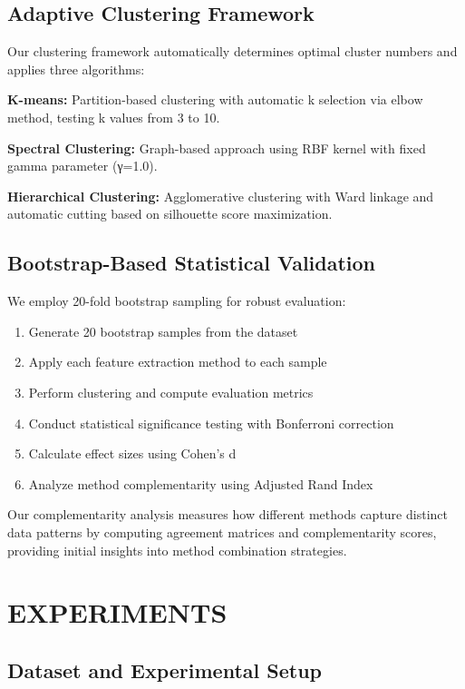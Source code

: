 \documentclass[sigconf]{acmart}
\begin{document}
\subsection{Adaptive Clustering Framework}

Our clustering framework automatically determines optimal cluster numbers and applies three algorithms:

\textbf{K-means:} Partition-based clustering with automatic k selection via elbow method, testing k values from 3 to 10.

\textbf{Spectral Clustering:} Graph-based approach using RBF kernel with fixed gamma parameter (γ=1.0).

\textbf{Hierarchical Clustering:} Agglomerative clustering with Ward linkage and automatic cutting based on silhouette score maximization.

\subsection{Bootstrap-Based Statistical Validation}

We employ 20-fold bootstrap sampling for robust evaluation:
\begin{enumerate}
\item Generate 20 bootstrap samples from the dataset
\item Apply each feature extraction method to each sample
\item Perform clustering and compute evaluation metrics
\item Conduct statistical significance testing with Bonferroni correction
\item Calculate effect sizes using Cohen's d
\item Analyze method complementarity using Adjusted Rand Index
\end{enumerate}

Our complementarity analysis measures how different methods capture distinct data patterns by computing agreement matrices and complementarity scores, providing initial insights into method combination strategies.

\section{EXPERIMENTS}

\subsection{Dataset and Experimental Setup}
\end{document}

